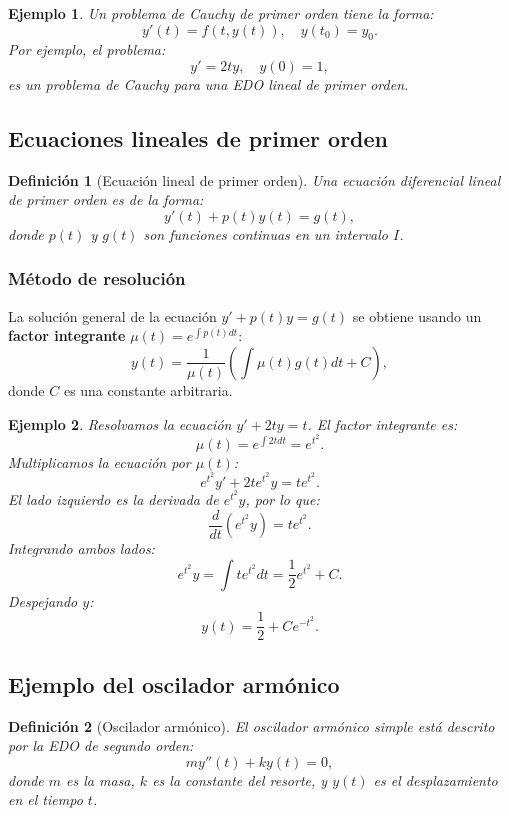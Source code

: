 \documentclass[12pt, a4paper]{article}
\theoremstyle{rioplatense}
\newtheorem{definicion}{Definición}[section]
\newtheorem{ejemplo}{Ejemplo}[section]
\begin{document}
\begin{ejemplo}
    Un problema de Cauchy de primer orden tiene la forma:
    $$
    y'(t) = f(t, y(t)), \quad y(t_0) = y_0.
    $$
    Por ejemplo, el problema:
    $$
    y' = 2ty, \quad y(0) = 1,
    $$
    es un problema de Cauchy para una EDO lineal de primer orden.
\end{ejemplo}

\subsection{Ecuaciones lineales de primer orden}
\begin{definicion}[Ecuación lineal de primer orden]
    Una ecuación diferencial lineal de primer orden es de la forma:
    $$
    y'(t) + p(t)y(t) = g(t),
    $$
    donde $p(t)$ y $g(t)$ son funciones continuas en un intervalo $I$.
\end{definicion}

\subsubsection{Método de resolución}
La solución general de la ecuación $y' + p(t)y = g(t)$ se obtiene usando un \textbf{factor integrante} $\mu(t) = e^{\int p(t)  dt}$:
$$
y(t) = \frac{1}{\mu(t)} \left( \int \mu(t) g(t)  dt + C \right),
$$
donde $C$ es una constante arbitraria.

\begin{ejemplo}
    Resolvamos la ecuación $y' + 2ty = t$. El factor integrante es:
    $$
    \mu(t) = e^{\int 2t  dt} = e^{t^2}.
    $$
    Multiplicamos la ecuación por $\mu(t)$:
    $$
    e^{t^2} y' + 2t e^{t^2} y = t e^{t^2}.
    $$
    El lado izquierdo es la derivada de $e^{t^2} y$, por lo que:
    $$
    \frac{d}{dt} \left( e^{t^2} y \right) = t e^{t^2}.
    $$
    Integrando ambos lados:
    $$
    e^{t^2} y = \int t e^{t^2}  dt = \frac{1}{2} e^{t^2} + C.
    $$
    Despejando $y$:
    $$
    y(t) = \frac{1}{2} + C e^{-t^2}.
    $$
\end{ejemplo}

\subsection{Ejemplo del oscilador armónico}
\begin{definicion}[Oscilador armónico]
    El oscilador armónico simple está descrito por la EDO de segundo orden:
    $$
    m y''(t) + k y(t) = 0,
    $$
    donde $m$ es la masa, $k$ es la constante del resorte, y $y(t)$ es el desplazamiento en el tiempo $t$.
\end{definicion}
\end{document}

